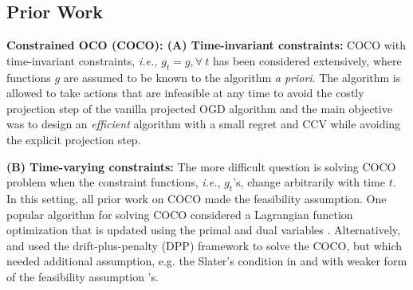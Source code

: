 \subsection{Prior Work}
 {\bf Constrained OCO (COCO): (A) Time-invariant constraints:} COCO with time-invariant constraints, \emph{i.e.,} $g_{t} = g, \forall \ t$ \citep{yuan2018online, jenatton2016adaptive, mahdavi2012trading, yi2021regret} has been considered extensively, where functions $g$ are assumed to be known to the algorithm \emph{a priori}. The algorithm is allowed to take actions that are infeasible at any time to avoid the costly projection step of the vanilla projected OGD algorithm and the main objective was to design an \emph{efficient} algorithm  with a small regret and CCV while avoiding  the explicit projection step. 

{\bf (B) Time-varying constraints:} The more difficult question is solving COCO problem when the constraint functions, \emph{i.e.}, $g_{t}$'s, change arbitrarily with time $t$.  
In this setting, all prior work on COCO made the feasibility assumption.
One popular algorithm for solving COCO considered a Lagrangian function optimization that is updated using the primal and dual variables \citep{yu2017online, pmlr-v70-sun17a, yi2023distributed}. Alternatively, \citet{neely2017online} and \cite{georgios-cautious} used the drift-plus-penalty (DPP) framework  \citet{neely2010stochastic} to solve the COCO, but which needed additional assumption, e.g. the Slater's condition in \citet{neely2017online} and with weaker form of the feasibility assumption \cite{neely2017online}'s. 
